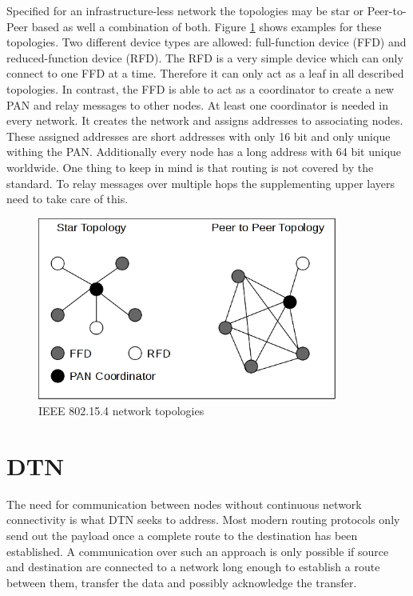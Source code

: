 Specified for an infrastructure-less network the topologies may be star or
Peer-to-Peer based as well a combination of both. Figure \ref{fig:802154topologies}
shows examples for these topologies. Two different device types are allowed:
full-function device (FFD) and
reduced-function device (RFD). The RFD is a very simple device which can only
connect to one FFD at a time. Therefore it can only act as a leaf in all
described topologies. In contrast, the FFD is able to act as a coordinator to
create a new PAN and relay messages to other nodes. At least one coordinator
is needed in every network. It creates the network and assigns addresses to
associating nodes. These assigned addresses are short addresses with only 16 bit
and only unique withing the PAN. Additionally every node has a long address with
64 bit unique worldwide. One thing to keep in mind is that routing is not
covered by the standard. To relay messages over multiple hops the supplementing
upper layers need to take care of this.

\begin{figure}
  \begin{center}
    \includegraphics[height=6cm]{images/802154topology}
    \caption{IEEE 802.15.4 network topologies}
        \label{fig:802154topologies}
  \end{center}
\end{figure}

\section{DTN}
\label{introdtn}
The need for communication between nodes without continuous network
connectivity is what DTN seeks to address. Most modern routing protocols only
send out the payload once a complete route to the destination has been established.
A communication over such an approach is only possible if source and destination
are connected to a network long enough to establish a route between them,
transfer the data and possibly acknowledge the transfer.


